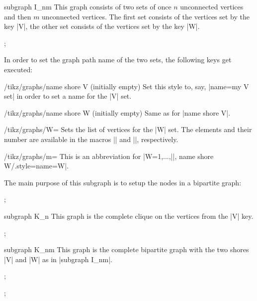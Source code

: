 \begin{graph}{subgraph I\_nm}
    This graph consists of two sets of once $n$ unconnected vertices and then
    $m$ unconnected vertices. The first set consists of the vertices set by the
    key |V|, the other set consists of the vertices set by the key |W|.
\begin{codeexample}[]
\tikz {};
\end{codeexample}
    In order to set the graph path name of the two sets, the following keys get
    executed:
    \begin{stylekey}{/tikz/graphs/name shore V (initially \normalfont empty)}
        Set this style to, say, |name=my V set| in order to set a name for the
        |V| set.
    \end{stylekey}
    \begin{stylekey}{/tikz/graphs/name shore W (initially \normalfont empty)}
        Same as for |name shore V|.
    \end{stylekey}
    \begin{key}{/tikz/graphs/W=}
        Sets the list of vertices for the |W| set. The elements and their
        number are available in the macros |\tikzgraphW| and |\tikzgraphWnum|,
        respectively.
    \end{key}
    \begin{key}{/tikz/graphs/m=}
        This is an abbreviation for
        |W={1,...,||}, name shore W/.style={name=W}|.
    \end{key}
    The main purpose of this subgraph is to setup the nodes in a bipartite
    graph:
\begin{codeexample}[]
\tikz {};
\end{codeexample}
\end{graph}

\begin{graph}{subgraph K\_n}
    This graph is the complete clique on the vertices from the |V| key.
\begin{codeexample}[]
\tikz {};
\end{codeexample}
\end{graph}

\begin{graph}{subgraph K\_nm}
    This graph is the complete bipartite graph with the two shores |V| and |W|
    as in |subgraph I_nm|.
\begin{codeexample}[]
\tikz {};
\end{codeexample}
\begin{codeexample}[]
\tikz {};
\end{codeexample}
\end{graph}


